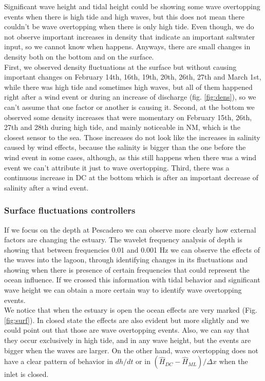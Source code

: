 \documentclass[11pt,letterpaper]{article}
\begin{document}
Significant wave height and tidal height could be showing some wave overtopping events when there is high tide and high waves, but this does not mean there couldn't be wave overtopping when there is only high tide. Even though, we do not observe important increases in density that indicate an important saltwater input, so we cannot know when happens. Anyways, there are small changes in density both on the bottom and on the surface.\\

First, we observed density fluctuations at the surface but without causing important changes on February 14th, 16th, 19th, 20th, 26th, 27th and March 1st, while there was high tide and sometimes high waves, but all of them happened right after a wind event or during an increase of discharge (fig. \ref{fig:dens}), so we can't assume that one factor or another is causing it. Second, at the bottom we observed some density increases that were momentary on February 15th, 26th, 27th and 28th during high tide, and mainly noticeable in NM, which is the closest sensor to the sea. Those increases do not look like the increases in salinity caused by wind effects, because the salinity is bigger than the one before the wind event in some cases, although, as this still happens when there was a wind event we can't attribute it just to wave overtopping. Third, there was a continuous increase in DC at the bottom which is after an important decrease of salinity after a wind event.\\

\subsubsection{Surface fluctuations controllers}

If we focus on the depth at Pescadero we can observe more clearly how external factors are changing the estuary. The wavelet frequency analysis of depth is showing that between frequencies 0.01 and 0.001 Hz we can observe the effects of the waves into the lagoon, through identifying changes in its fluctuations and showing when there is presence of certain frequencies that could represent the ocean influence. If we crossed this information with tidal behavior and significant wave height we can obtain a more certain way to identify wave overtopping events. \\

We notice that when the estuary is open the ocean effects are very marked (Fig. \ref{fig:surf}). In closed state the effects are also evident but more slightly and we could point out that those are wave overtopping events. Also, we can say that they occur exclusively in high tide, and in any wave height, but the events are bigger when the waves are larger. On the other hand, wave overtopping does not have a clear pattern of behavior in $dh/dt$ or in $(\hat{H}_{DC}-\hat{H}_{ML})/\Delta x$ when the inlet is closed.\\
\end{document}
